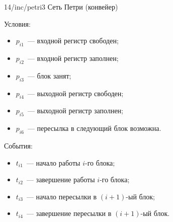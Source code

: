 \image
{\textwidth}
{14/inc/petri3}
{Сеть Петри (конвейер)}

Условия:

\begin{itemize}
    \item $p_{i1}$~--- входной регистр свободен;
    \item $p_{i2}$~--- входной регистр заполнен;
    \item $p_{i3}$~--- блок занят;
    \item $p_{i4}$~--- выходной регистр свободен;
    \item $p_{i5}$~--- выходной регистр заполнен;
    \item $p_{i6}$~--- пересылка в следующий блок возможна.
\end{itemize}

События:

\begin{itemize}
    \item $t_{i1}$~--- начало работы $i$-го блока;
    \item $t_{i2}$~--- завершение работы $i$-го блока;
    \item $t_{i3}$~--- начало пересылки в ${(i+1)}$-ый блок;
    \item $t_{i4}$~--- завершение пересылки в ${(i+1)}$-ый блок.
\end{itemize}


